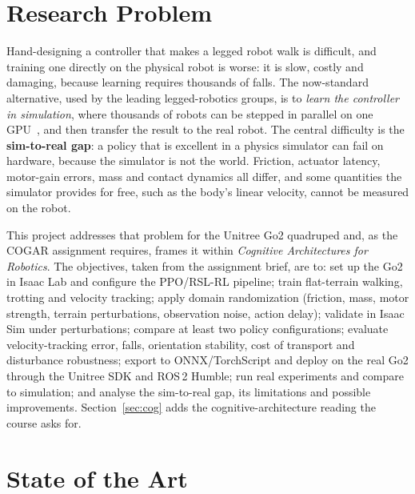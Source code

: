 \documentclass[conference]{IEEEtran}
\begin{document}
\section{Research Problem}
\label{sec:problem}

Hand-designing a controller that makes a legged robot walk is difficult, and training one
directly on the physical robot is worse: it is slow, costly and damaging, because learning
requires thousands of falls. The now-standard alternative, used by the leading legged-robotics
groups, is to \emph{learn the controller in simulation}, where thousands of robots can be stepped
in parallel on one GPU~\cite{rudin2022}, and then transfer the result to the real robot. The
central difficulty is the \textbf{sim-to-real gap}: a policy that is excellent in a physics
simulator can fail on hardware, because the simulator is not the world. Friction, actuator
latency, motor-gain errors, mass and contact dynamics all differ, and some quantities the
simulator provides for free, such as the body's linear velocity, cannot be measured on the
robot.

This project addresses that problem for the Unitree Go2 quadruped and, as the COGAR assignment
requires, frames it within \emph{Cognitive Architectures for Robotics}. The objectives, taken
from the assignment brief, are to: set up the Go2 in Isaac Lab and configure the PPO/RSL-RL
pipeline; train flat-terrain walking, trotting and velocity tracking; apply domain randomization
(friction, mass, motor strength, terrain perturbations, observation noise, action delay);
validate in Isaac Sim under perturbations; compare at least two policy configurations; evaluate
velocity-tracking error, falls, orientation stability, cost of transport and disturbance
robustness; export to ONNX/TorchScript and deploy on the real Go2 through the Unitree SDK and
ROS\,2 Humble; run real experiments and compare to simulation; and analyse the sim-to-real gap,
its limitations and possible improvements. Section~\ref{sec:cog} adds the cognitive-architecture
reading the course asks for.

\section{State of the Art}
\label{sec:sota}
\end{document}
